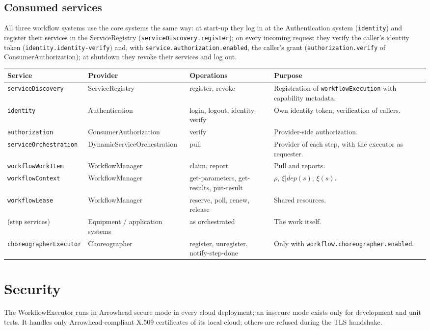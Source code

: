 \documentclass[a4paper]{arrowhead}
\begin{document}
\subsection{Consumed services}
All three workflow systems use the core systems the same way: at start-up they log in at the Authentication
system (\texttt{identity}) and register their services in the ServiceRegistry (\texttt{serviceDiscovery.register});
on every incoming request they verify the caller's identity token (\texttt{identity.identity-verify}) and, with
\texttt{service.authorization.enabled}, the caller's grant (\texttt{authorization.verify} of ConsumerAuthorization);
at shutdown they revoke their services and log out.

{\small
\begin{longtable}{|p{3.4cm}|p{3.2cm}|p{3.6cm}|p{5.6cm}|}

\hline
\rowcolor{gray!33} Service & Provider & Operations & Purpose \\ \hline
\endhead
\texttt{serviceDiscovery} & ServiceRegistry & register, revoke & Registration of \texttt{workflowExecution} with capability metadata. \\ \hline
\texttt{identity} & Authentication & login, logout, identity-verify & Own identity token; verification of callers. \\ \hline
\texttt{authorization} & ConsumerAuthorization & verify & Provider-side authorization. \\ \hline
\texttt{serviceOrchestration} & DynamicServiceOrchestration & pull & Provider of each step, with the executor as requester. \\ \hline
\texttt{workflowWorkItem} & WorkflowManager & claim, report & Pull and reports. \\ \hline
\texttt{workflowContext} & WorkflowManager & get-parameters, get-results, put-result & $\rho$, $\xi|dep(s)$, $\xi(s)$. \\ \hline
\texttt{workflowLease} & WorkflowManager & reserve, poll, renew, release & Shared resources. \\ \hline
(step services) & Equipment / application systems & as orchestrated & The work itself. \\ \hline
\texttt{choreographerExecutor} & Choreographer & register, unregister, notify-step-done & Only with \texttt{workflow.choreographer.enabled}. \\ \hline
\end{longtable}
}


\newpage
\section{Security}
\label{sec:security}
The WorkflowExecutor runs in Arrowhead secure mode in every cloud deployment; an insecure mode exists only for development and
unit tests. It handles only Arrowhead-compliant X.509 certificates of its local cloud; others are refused during the
TLS handshake.
\end{document}
